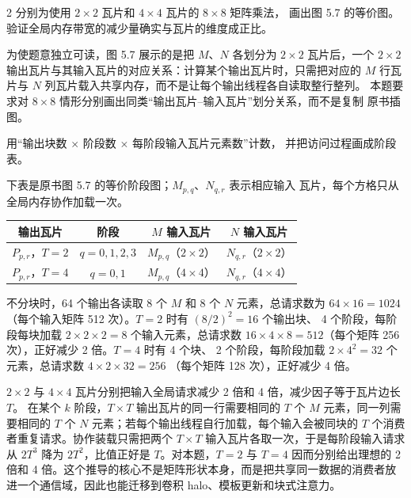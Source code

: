 \begin{solutionexercise}{2}
\problemheading 分别为使用 $2\times2$ 瓦片和 $4\times4$ 瓦片的 $8\times8$ 矩阵乘法，
画出图 5.7 的等价图。验证全局内存带宽的减少量确实与瓦片的维度成正比。

为使题意独立可读，图 5.7 展示的是把 $M$、$N$ 各划分为 $2\times2$ 瓦片后，一个
$2\times2$ 输出瓦片与其输入瓦片的对应关系：计算某个输出瓦片时，只需把对应的
$M$ 行瓦片与 $N$ 列瓦片载入共享内存，而不是让每个输出线程各自读取整行整列。
本题要求对 $8\times8$ 情形分别画出同类“输出瓦片--输入瓦片”划分关系，而不是复制
原书插图。

\approachheading 用“输出块数 $\times$ 阶段数 $\times$ 每阶段输入瓦片元素数”计数，
并把访问过程画成阶段表。

\answerheading 下表是原书图 5.7 的等价阶段图；$M_{p,q}$、$N_{q,r}$ 表示相应输入
瓦片，每个方格只从全局内存协作加载一次。

\begin{center}
\begin{tabular}{c@{\quad}c@{\quad}c@{\quad}c}
\toprule
输出瓦片 & 阶段 & $M$ 输入瓦片 & $N$ 输入瓦片\\
\midrule
$P_{p,r}$，$T=2$ & $q=0,1,2,3$ & $M_{p,q}$（$2\times2$） & $N_{q,r}$（$2\times2$）\\
$P_{p,r}$，$T=4$ & $q=0,1$ & $M_{p,q}$（$4\times4$） & $N_{q,r}$（$4\times4$）\\
\bottomrule
\end{tabular}
\end{center}

不分块时，64 个输出各读取 8 个 $M$ 和 8 个 $N$ 元素，总请求数为
$64\times16=1024$（每个输入矩阵 512 次）。$T=2$ 时有 $(8/2)^2=16$ 个输出块、
4 个阶段，每阶段每块加载 $2\times2\times2=8$ 个输入元素，总请求数
$16\times4\times8=512$（每个矩阵 256 次），正好减少 2 倍。$T=4$ 时有 4 个块、
2 个阶段，每阶段加载 $2\times4^2=32$ 个元素，总请求数 $4\times2\times32=256$
（每个矩阵 128 次），正好减少 4 倍。

\conclusionheading $2\times2$ 与 $4\times4$ 瓦片分别把输入全局请求减少 2 倍和
4 倍，减少因子等于瓦片边长 $T$。
\discussionheading
{}
在某个 $k$ 阶段，$T\times T$ 输出瓦片的同一行需要相同的 $T$ 个 $M$ 元素，同一列需要相同的 $T$ 个 $N$ 元素；若每个输出线程自行加载，每个输入会被同块的 $T$ 个消费者重复请求。协作装载只需把两个 $T\times T$ 输入瓦片各取一次，于是每阶段输入请求从 $2T^3$ 降为 $2T^2$，比值正好是 $T$。对本题，$T=2$ 与 $T=4$ 因而分别给出理想的 2 倍和 4 倍。这个推导的核心不是矩阵形状本身，而是把共享同一数据的消费者放进一个通信域，因此也能迁移到卷积 halo、模板更新和块式注意力。


\end{solutionexercise}

